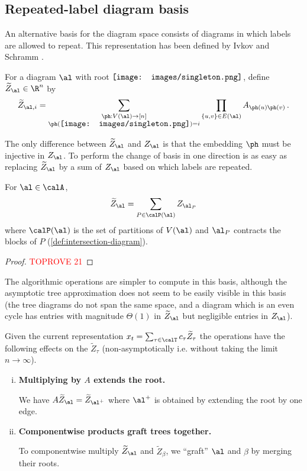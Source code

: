 \documentclass[12pt]{article}
\newcommand{\rootpic}{\vcenter{\hbox{\texttt{[image: images/singleton.png]}}}}
\newcommand{\smallrootpic}{\vcenter{\hbox{\texttt{[image: images/singleton.png]}}}}
\begin{document}
\subsection{Repeated-label diagram basis}
\label{sec:repeated-labels}

An alternative basis for the diagram space consists of diagrams
in which labels are allowed to repeat.
This representation has been defined by Ivkov and Schramm \cite[Section 3.5]{ivkov2023semidefinite}.

\begin{definition}[$\widetilde{Z}_\al$]
For a diagram $\al$ with
root $\rootpic$, define $\widetilde{Z}_\al \in \R^n$ by
\[\widetilde{Z}_{\al,i} = \sum_{\substack{\ph: V(\al) \to [n]\\\ph(\smallrootpic) = i}} \prod_{\{u,v\} \in E(\al)} A_{\ph(u)\ph(v)}\,.\]
\end{definition}


The only difference between $\widetilde{Z}_\al$ and $Z_\al$ is that the embedding
$\ph$ must be injective in $Z_\al$.
To perform the change of 
basis in one direction is as easy as replacing $\widetilde{Z}_\al$
by a sum of $Z_\al$
based on which labels are repeated.


\begin{lemma}\label{lem:change-basis}
    For $\al \in \calA$,
    \[\widetilde{Z}_\al = \sum_{P \in \calP(\al)} Z_{\al_P}\]
    where $\calP(\al)$ is the set of partitions of $V(\al)$ and $\al_P$
    contracts the blocks of $P$ (\cref{def:intersection-diagram}).
\end{lemma}
\begin{proof}\textcolor{red}{TOPROVE 21}\end{proof}

The algorithmic operations are simpler to compute in this basis,
although the asymptotic tree approximation does not seem to be easily visible
in this basis
(the tree diagrams do not span the same space, and a diagram which is an even cycle has entries with magnitude $\Theta(1)$ in $\widetilde{Z}_\al$ but negligible entries in $Z_\al$).



Given the current representation $x_t = \sum_{\tau \in \calT} c_\tau \widetilde{Z}_\tau$
the operations have the following effects on the $\widetilde{Z}_\tau$
(non-asymptotically i.e. without taking the limit $n \to \infty$).
\begin{enumerate}[(i)]
    \item \textbf{Multiplying by $A$ extends the root.}

    We have $A \widetilde{Z}_\al = \widetilde{Z}_{\al^+}$ where $\al^+$ is obtained by extending the root by one edge.
    \item \textbf{Componentwise products graft trees together.}

    To componentwise multiply $\widetilde{Z}_\al$ and $\widetilde{Z}_\beta$,
    we ``graft'' $\al$ and $\beta$ by merging their roots.
\end{enumerate}
\end{document}
